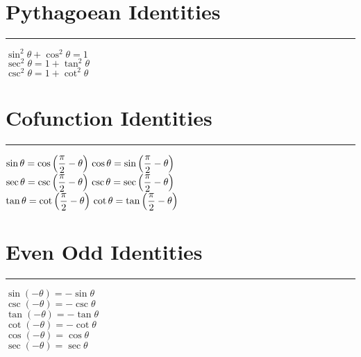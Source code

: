 \documentclass{article}
\begin{document}
\LARGE
\section{Pythagoean Identities}
\hrule
\begin{multicols}{3}
    \noindent
    $\sin ^2 \theta + \cos ^2 \theta = 1$  \\
    $\sec ^2 \theta = 1 + \tan ^2 \theta$  \\
    $\csc ^2 \theta = 1 + \cot ^2 \theta$
\end{multicols}

\section{Cofunction Identities}
\hrule
\begin{multicols}{3}
    \noindent
    $\sin\theta=\cos\left(\dfrac{\pi}{2}-\theta\right)\\\\
    \cos\theta=\sin\left(\dfrac{\pi}{2}-\theta\right)$ \\
    $\sec\theta=\csc\left(\dfrac{\pi}{2}-\theta\right)\\\\
    \csc\theta=\sec\left(\dfrac{\pi}{2}-\theta\right)$\\
    $\tan\theta=\cot\left(\dfrac{\pi}{2}-\theta\right)\\\\
    \cot\theta=\tan\left(\dfrac{\pi}{2}-\theta\right)$
\end{multicols}

\section{Even Odd Identities}
\hrule
\begin{multicols}{3}
    \noindent
    $\sin(-\theta) = -\sin\theta$ \\
    $\csc(-\theta) = -\csc\theta$ \\
    $\tan(-\theta) = -\tan\theta$ \\
    $\cot(-\theta) = -\cot\theta$ \\
    $\cos(-\theta) = \cos\theta$ \\
    $\sec(-\theta) = \sec\theta$ 
\end{multicols}
\end{document}
